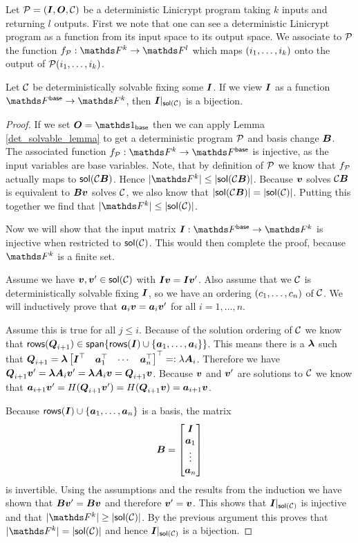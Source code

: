 Let $\P = (\I, \O, \C)$ be a deterministic Linicrypt program taking $k$ inputs and returning $l$ outputs.
First we note that one can see a deterministic Linicrypt program as a function from its input space to its output space.
We associate to $\P$ the function $f_\P: \F^k \to \F^l$ which maps $(\dts i k)$ onto the output of $\P(\dts i k)$.

\begin{lemma}
\label{solution_space_bijection}
    Let $\C$ be deterministically solvable fixing some $\I$.
    If we view $\I$ as a function $\Fsp \to \F^k$,
    then $\I|_{\sol(\C)}$ is a bijection.
\end{lemma}

\begin{proof}
    If we set $\O = \Id_\base$
    then we can apply Lemma \ref{det_solvable_lemma} to get a deterministic program $\P$ and basis change $\B$. 
    The associated function $f_{\P}: \F^k \to \F^\base$ is injective,
    as the input variables are base variables.
    Note, that by definition of $\P$ we know that $f_{\P}$ actually maps to $\sol(\C\B)$.
    Hence $|\F^k| \leq |\sol(\C\B)|$.
    Because $\vv$ solves $\C\B$ is equivalent to $\B\vv$ solves $\C$,
    we also know that $|\sol(\C\B)| = |\sol(\C)|$. 
    Putting this together we find that $|\F^k| \leq |\sol(\C)|$.

    Now we will show that the input matrix $\I: \Fsp \to \F^k$ is injective
    when restricted to $\sol(\C)$.
    This would then complete the proof, because $\F^k$ is a finite set.
    
    Assume we have $\vv, \vv' \in \sol(\C)$ with $\I\vv = \I\vv'$.
    Also assume that we $\C$ is deterministically solvable fixing $\I$,
    so we have an ordering $(\dts c n)$ of $\C$.
    We will inductively prove that $\va_i \vv = \va_i \vv'$ for all $i = 1, \dots, n$.

    Assume this is true for all $ j \leq i$.
    Because of the solution ordering of $\C$ we know that
    $\rows(\Q_{i+1}) \in \spn\{ \rows(\I) \cup \{\dts \va {i}\}\}$. 
    This means there is a $\v \lambda$ such that $\Q_{i+1} = \v \lambda \m{\I^\top & \va_1^\top & \cdots & \va_n^\top}^\top =: \lambda \v A_i$.
    Therefore we have $\Q_{i+1} \vv' = \vl \v A_i \vv' = \vl \v A_i \vv = \Q_{i+1} \vv$.
    Because $\vv$ and $\vv'$ are solutions to $\C$ we know that
    $\va_{i+1}\vv' = \H(\Q_{i+1}\vv') = \H(\Q_{i+1}\vv) = \va_{i+1}\vv$.

    Because $\rows(\I) \cup \{\va_1, \dots, \va_n\}$ is a basis, 
    the matrix 
    \[
    \B = \m{\I \\ \vdts \va n}
    \]
    is invertible.
    Using the assumptions and the results from the induction we have shown that $\B \vv' = \B \vv$ and
    therefore $\vv' = \vv$.
    This shows that $\I|_{\sol(\C)}$ is injective and that $|\F^k| \geq |\sol(\C)|$.
    By the previous argument this proves that $|\F^k| = |\sol(\C)|$
    and hence $\I|_{\sol(\C)}$ is a bijection.
\end{proof}

